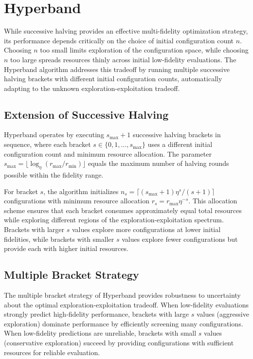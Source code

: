 \section{Hyperband}
\label{sec:hyperband}

While successive halving provides an effective multi-fidelity optimization strategy, its performance depends critically on the choice of initial configuration count $n$. Choosing $n$ too small limits exploration of the configuration space, while choosing $n$ too large spreads resources thinly across initial low-fidelity evaluations. The Hyperband algorithm addresses this tradeoff by running multiple successive halving brackets with different initial configuration counts, automatically adapting to the unknown exploration-exploitation tradeoff.

\subsection{Extension of Successive Halving}

Hyperband operates by executing $s_{\max} + 1$ successive halving brackets in sequence, where each bracket $s \in \{0, 1, \ldots, s_{\max}\}$ uses a different initial configuration count and minimum resource allocation. The parameter $s_{\max} = \lfloor \log_\eta(r_{\max}/r_{\min}) \rfloor$ equals the maximum number of halving rounds possible within the fidelity range.

For bracket $s$, the algorithm initializes $n_s = \lceil (s_{\max}+1) \eta^s / (s+1) \rceil$ configurations with minimum resource allocation $r_s = r_{\max} \eta^{-s}$. This allocation scheme ensures that each bracket consumes approximately equal total resources while exploring different regions of the exploration-exploitation spectrum. Brackets with larger $s$ values explore more configurations at lower initial fidelities, while brackets with smaller $s$ values explore fewer configurations but provide each with higher initial resources.

\subsection{Multiple Bracket Strategy}

The multiple bracket strategy of Hyperband provides robustness to uncertainty about the optimal exploration-exploitation tradeoff. When low-fidelity evaluations strongly predict high-fidelity performance, brackets with large $s$ values (aggressive exploration) dominate performance by efficiently screening many configurations. When low-fidelity predictions are unreliable, brackets with small $s$ values (conservative exploration) succeed by providing configurations with sufficient resources for reliable evaluation.

